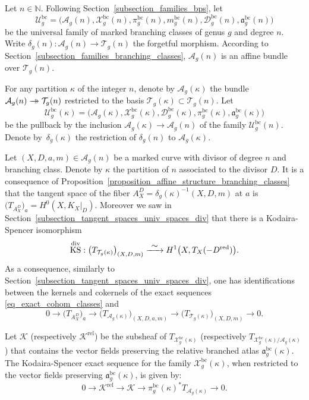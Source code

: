 \documentclass[JEP,XML,SOM,Unicode,NoEqCountersInSection,published]{cedram}
\newcommand{\onto}{\mathchoice{\to\hspace*{-5mm}\to}{\to\hspace*{-2.85mm}\to}{\to\hspace*{-3mm}\to}{\to\hspace*{-3mm}\to}}
\newcommand\To[1]{\mathchoice{\xrightarrow{\textstyle\kern4pt#1\kern3pt}}{\stackrel{#1}{\longrightarrow}}{}{}}
\newcommand{\N}{\mathbb N}
\newcommand{\BC}{\mathrm{bc}}
\newcommand{\red}{\mathrm{red}}
\newcommand{\rel}{\mathrm{rel}}
\DeclareMathOperator{\Div}{div}
\DeclareMathOperator{\KS}{KS}
\theoremstyle{definition}
\theoremstyle{plain}
\begin{document}
Let $n \in \N$.
Following Section~\ref{subsection_families_bps}, let
\[
\mathcal U_g^{\BC} = \big(\mathcal A_g(n), \mathcal X_g^{\BC}(n), \pi_g^{\BC}(n), m_g^{\BC}(n), \mathcal D_g^{\BC}(n), \mathfrak a_g^{\BC}(n)\big)
\]
be the universal family of marked branching classes of genus $g$ and degree $n$.
Write $\delta_g(n): \mathcal A_g(n) \to \mathcal T_g(n)$ the forgetful morphism.
According to Section~\ref{subsection_families_branching_classes}, $\mathcal A_g(n)$ is an affine bundle over $\mathcal T_g(n)$.

For any partition $\kappa$ of the integer $n$, denote by $\mathcal A_g(\kappa)$ the bundle $\mathcal A_g(n) \onto \mathcal T_g(n)$ restricted to the basis $\mathcal T_g(\kappa) \subset \mathcal T_g(n)$.
Let
\[
\mathcal U_g^{\BC}(\kappa) = \big(\mathcal A_g(\kappa), \mathcal X^{\BC}_g(\kappa), \mathcal D_g^{\BC}(\kappa), \pi_g^{\BC}(\kappa), \mathfrak a_g^{\BC}(\kappa)\big)
\]
be the pullback by the inclusion $\mathcal A_g(\kappa) \!\to\! \mathcal A_g(n)$ of the family $\mathcal U_g^{\BC}(n)$.
Denote by~$\delta_g(\kappa)$ the restriction of $\delta_g(n)$ to $\mathcal A_g(\kappa)$.

Let $(X, D, a, m) \in \mathcal A_g(n)$ be a marked curve with divisor of degree $n$ and branching class.
Denote by $\kappa$ the partition of $n$ associated to the divisor $D$.
It is a consequence of Proposition~\ref{proposition_affine_structure_branching_classes} that the tangent space of the fiber $A_X^D = \delta_g(\kappa)^{-1}(X, D, m)$ at $a$ is $\bigl(T_{A_X^D}\bigr)_{a} = H^0(X, K_X|_D)$.
Moreover we saw in Section~\ref{subsection_tangent_spaces_univ_spaces_div} that there is a Kodaira-Spencer isomorphism
\[
\KS^{\Div}: \bigl(T_{\mathcal T_g(\kappa)}\bigr)_{(X, D, m)} \To{\sim} H^1\bigl(X, T_X(-D^{\red})\bigr).
\]
As a consequence, similarly to Section~\ref{subsection_tangent_spaces_univ_spaces_div}, one has identifications between the kernels and cokernels of the exact sequences \eqref{eq_exact_cohom_classes} and
\begin{equation*}
0 \to \bigl(T_{A_X^D}\bigr)_a \to \bigl(T_{\mathcal A_g(\kappa)}\bigr)_{(X, D, a, m)} \to \bigl(T_{\mathcal T_g(\kappa)}\bigr)_{(X, D, m)} \to 0.
\end{equation*}

Let $\mathcal K$ (respectively $\mathcal K^{\rel}$) be the subsheaf of $T_{\mathcal X^{\BC}_g(\kappa)}$ (respectively $T_{\mathcal X^{\BC}_g(\kappa)/\mathcal A_g(\kappa)}$) that contains the vector fields preserving the relative branched atlas $\mathfrak a_g^{\BC}(\kappa)$.
The Kodaira-Spencer exact sequence for the family $\mathcal X^{\BC}_g(\kappa)$, when restricted to the vector fields preserving $\mathfrak a_g^{\BC}(\kappa)$, is given by:
\begin{equation*}
0 \to \mathcal K^{\rel} \to \mathcal K \to \pi_g^{\BC}(\kappa)^* T_{\mathcal A_g(\kappa)} \to 0.
\end{equation*}
\end{document}
